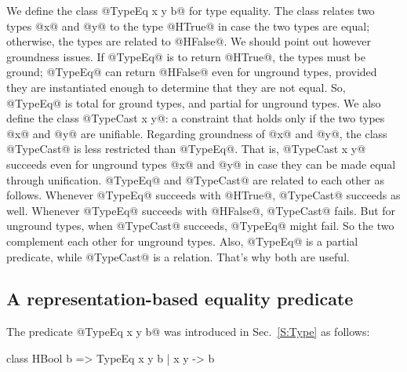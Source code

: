 \documentclass[nocopyrightspace,preprint]{sigplan-proc}
\newcommand{\hwVsTr}[2]{#2}
\begin{document}
\hwVsTr{

We define the class @TypeEq x y b@ that decides if two types @x@ and
@y@ are equal or not. To be precise, the class relates two ground types @x@
and @y@ to the type @HTrue@ just in case the two types are
equal. Otherwise, the types are related to @HFalse@. We also define
the class @TypeCast x y@: a constraint that holds only if two types
@x@ and @y@ are unifiable. We must first mention that the notions of
type equality and unification are far from being clear-cut due to the
presence of polymorphic types (types with uninstantiated type
variables). Higher-rank types (with explicitly quantified type
variables) add yet another layer of complexity.

}{

We define the class @TypeEq x y b@ for type equality. The class
relates two types @x@ and @y@ to the type @HTrue@ in case the two
types are equal; otherwise, the types are related to @HFalse@.  We
should point out however groundness issues. If @TypeEq@ is to return
@HTrue@, the types must be ground; @TypeEq@ can return @HFalse@ even
for unground types, provided they are instantiated enough to determine
that they are not equal. So, @TypeEq@ is total for ground types, and
partial for unground types. We also define the class @TypeCast x y@: a
constraint that holds only if the two types @x@ and @y@ are
unifiable. Regarding groundness of @x@ and @y@, the class @TypeCast@
is less restricted than @TypeEq@. That is, @TypeCast x y@ succeeds
even for unground types @x@ and @y@ in case they can be made equal
through unification. @TypeEq@ and @TypeCast@ are related to each other
as follows. Whenever @TypeEq@ succeeds with @HTrue@, @TypeCast@
succeeds as well. Whenever @TypeEq@ succeeds with @HFalse@, @TypeCast@
fails. But for unground types, when @TypeCast@ succeeds, @TypeEq@
might fail. So the two complement each other for unground types.
Also, @TypeEq@ is a partial predicate, while @TypeCast@ is a relation.
That's why both are useful.

}



\medskip

\subsection*{A representation-based equality predicate}

The predicate @TypeEq x y b@ was introduced in Sec.~\ref{S:Type} as
follows:

\begin{code}
 class HBool b => TypeEq x y b | x y -> b
\end{code}
\end{document}
